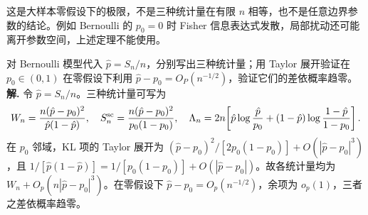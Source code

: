 这是大样本零假设下的极限，不是三种统计量在有限 \(n\) 相等，也不是任意边界参数的结论。例如 Bernoulli 的 \(p_0=0\) 时 Fisher 信息表达式发散，局部扰动还可能离开参数空间，上述定理不能使用。



\par
\begin{workedexample}
对 Bernoulli 模型代入 \(\widehat p=S_n/n\)，分别写出三种统计量；用 Taylor 展开验证在 \(p_0\in(0,1)\) 在零假设下利用 \(\hat p-p_0=O_P(n^{-1/2})\)，验证它们的差依概率趋零。
\textbf{解.} 令 \(\hat p=S_n/n\)。三种统计量可写为
\[
W_n=\frac{n(\hat p-p_0)^2}{\hat p(1-\hat p)},\quad
S_n^{\rm sc}=\frac{n(\hat p-p_0)^2}{p_0(1-p_0)},\quad
\Lambda_n=2n\!\left[\hat p\log\frac{\hat p}{p_0}+(1-\hat p)\log\frac{1-\hat p}{1-p_0}\right].
\]
在 \(p_0\) 邻域，KL 项的 Taylor 展开为 \((\hat p-p_0)^2/[2p_0(1-p_0)]+O(|\hat p-p_0|^3)\)，且 \(1/[\hat p(1-\hat p)]=1/[p_0(1-p_0)]+O(|\hat p-p_0|)\)。故各统计量均为 \(W_n+O_p(n|\hat p-p_0|^3)\)。在零假设下 \(\hat p-p_0=O_p(n^{-1/2})\)，余项为 \(o_p(1)\)，三者之差依概率趋零。
\end{workedexample}
\par
